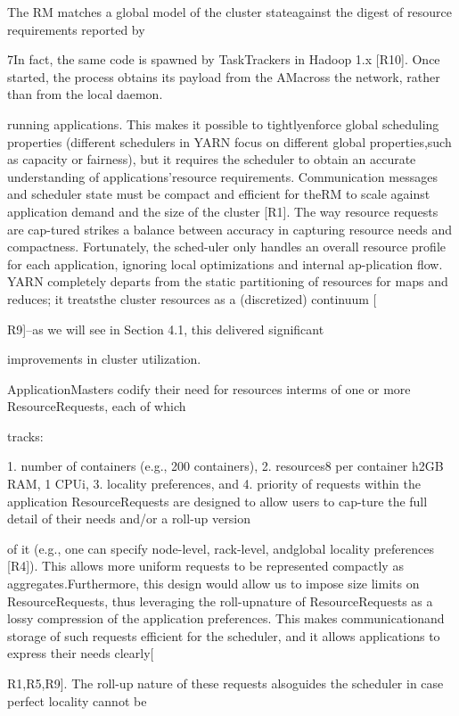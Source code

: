 The RM matches a global model of the cluster stateagainst the digest of resource requirements reported by

7In fact, the same code is spawned by TaskTrackers in Hadoop
1.x [R10]. Once started, the process obtains its payload from the AMacross the network, rather than from the local daemon.

running applications. This makes it possible to tightlyenforce global scheduling properties (different schedulers in YARN focus on different global properties,such as capacity or fairness), but it requires the scheduler to obtain an accurate understanding of applications'resource requirements. Communication messages and
scheduler state must be compact and efficient for theRM to scale against application demand and the size
of the cluster [R1]. The way resource requests are cap-tured strikes a balance between accuracy in capturing
resource needs and compactness. Fortunately, the sched-uler only handles an overall resource profile for each application, ignoring local optimizations and internal ap-plication flow. YARN completely departs from the static
partitioning of resources for maps and reduces; it treatsthe cluster resources as a (discretized) continuum [

R9]--as we will see in Section 4.1, this delivered significant

improvements in cluster utilization.

ApplicationMasters codify their need for resources interms of one or more ResourceRequests, each of which

tracks:

1. number of containers (e.g., 200 containers),
2. resources8 per container h2GB RAM, 1 CPUi,
3. locality preferences, and
4. priority of requests within the application
ResourceRequests are designed to allow users to cap-ture the full detail of their needs and/or a roll-up version

of it (e.g., one can specify node-level, rack-level, andglobal locality preferences [R4]). This allows more uniform requests to be represented compactly as aggregates.Furthermore, this design would allow us to impose size
limits on ResourceRequests, thus leveraging the roll-upnature of ResourceRequests as a lossy compression of
the application preferences. This makes communicationand storage of such requests efficient for the scheduler,
and it allows applications to express their needs clearly[

R1,R5,R9]. The roll-up nature of these requests alsoguides the scheduler in case perfect locality cannot be

